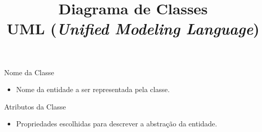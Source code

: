 
\title{Diagrama de Classes\\UML ({\em Unified Modeling Language})}

\frame{\maketitle}

\begin{frame}[fragile]{Nome da Classe}

  \begin{itemize}
  \item  Nome da entidade a ser representada pela classe.
  \end{itemize}

  \begin{center}
  \end{center}

\end{frame}


\begin{frame}[fragile]{Atributos da Classe}{}
  \begin{itemize}
  \item  Propriedades escolhidas para descrever a abstração da entidade.
  \end{itemize}

  \begin{center}
  \end{center}

\end{frame}

